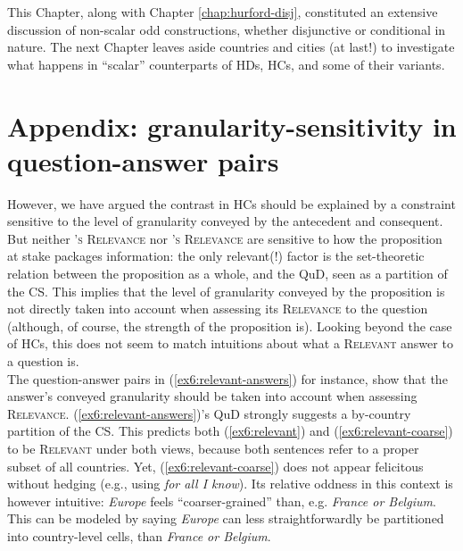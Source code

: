 This Chapter, along with Chapter \ref{chap:hurford-disj}, constituted an extensive discussion of non-scalar odd constructions, whether disjunctive or conditional in nature. The next Chapter leaves aside countries and cities (at last!) to investigate what happens in ``scalar'' counterparts of HDs, HCs, and some of their variants. 

\iffalse

\section{Appendix: granularity-sensitivity in question-answer pairs}

However, we have argued the contrast in HCs should be explained by a constraint sensitive to the level of granularity conveyed by the antecedent and consequent. But neither \textsc{\citeauthor{Lewis1988}'s Relevance} nor \textsc{\citeauthor{Roberts2012}'s Relevance} are sensitive to how the proposition at stake packages information: the only relevant(!) factor is the set-theoretic relation between the proposition as a whole, and the QuD, seen as a partition of the CS. This implies that the level of granularity conveyed by the proposition is not directly taken into account when assessing its \textsc{Relevance} to the question (although, of course, the strength of the proposition is). Looking beyond the case of HCs, this does not seem to match intuitions about what a \textsc{Relevant} answer to a question is.\\

The question-answer pairs in (\ref{ex6:relevant-answers}) for instance, show that the answer's conveyed granularity should be taken into account when assessing \textsc{Relevance}. (\ref{ex6:relevant-answers})'s QuD strongly suggests a by-country partition of the CS. This predicts both (\ref{ex6:relevant}) and (\ref{ex6:relevant-coarse}) to be \textsc{Relevant} under both views, because both sentences refer to a proper subset of all countries. Yet, (\ref{ex6:relevant-coarse}) does not appear felicitous without hedging (e.g., using \textit{for all I know}). Its relative oddness in this context is however intuitive: \textit{Europe} feels ``coarser-grained'' than, e.g. \textit{France or Belgium}. This can be modeled by saying \textit{Europe} can less straightforwardly be partitioned into country-level cells, than \textit{France or Belgium}. 


